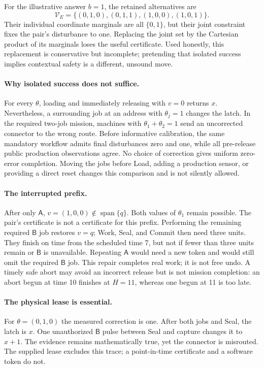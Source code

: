 \documentclass[11pt,a4paper]{article}
\theoremstyle{definition}
\newcommand{\V}{\mathcal V}
\begin{document}
For the illustrative answer $b=1$, the retained alternatives are
\[
 \V_E=\{(0,1,0),(0,1,1),(1,0,0),(1,0,1)\}.
\]
Their individual coordinate marginals are all $\{0,1\}$, but their joint
constraint fixes the pair's disturbance to one. Replacing the joint set by
the Cartesian product of its marginals loses the useful certificate. Used
honestly, this replacement is conservative but incomplete; pretending that
isolated success implies contextual safety is a different, unsound move.

\paragraph{Why isolated success does not suffice.}
For every $\theta$, loading and immediately releasing with $v=0$ returns
$x$. Nevertheless, a surrounding job at an address with $\theta_j=1$
changes the latch. In the required two-job mission, machines with
$\theta_1+\theta_2=1$ send an uncorrected connector to the wrong route.
Before informative calibration, the same mandatory workflow admits final
disturbances zero and one, while all pre-release public production
observations agree. No choice of correction gives uniform zero-error
completion. Moving the jobs before Load, adding a production sensor, or
providing a direct reset changes this comparison and is not silently allowed.

\paragraph{The interrupted prefix.}
After only $\mathsf A$, $v=(1,0,0)\notin\operatorname{span}\{q\}$.
Both values of $\theta_1$ remain possible. The pair's certificate is not a
certificate for this prefix. Performing the remaining required $\mathsf B$
job restores $v=q$; Work, Seal, and Commit then need three units. They
finish on time from the scheduled time 7, but not if fewer than three units
remain or $\mathsf B$ is unavailable. Repeating $\mathsf A$ would need a
new token and would still omit the required $\mathsf B$ job. This repair
completes real work; it is not free undo. A timely safe abort may avoid an
incorrect release but is not mission completion: an abort begun at time 10
finishes at $H=11$, whereas one begun at 11 is too late.

\paragraph{The physical lease is essential.}
For $\theta=(0,1,0)$ the measured correction is one. After both jobs and
Seal, the latch is $x$. One unauthorized $\mathsf B$ pulse between Seal and
capture changes it to $x+1$. The evidence remains mathematically true, yet
the connector is misrouted. The supplied lease excludes this trace; a
point-in-time certificate and a software token do not.
\end{document}
